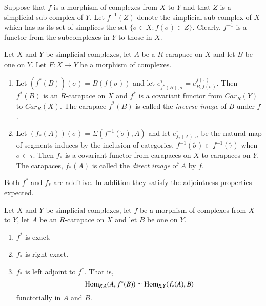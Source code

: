 Suppose that $f$ is a morphism of complexes from $X$ to $Y$ and that $Z$ is a simplicial sub-complex of $Y$. Let $f^{-1}(Z)$ denote the simplicial sub-complex of $X$ which has as its set of simplices the set $\{\sigma \in X : f(\sigma)\in Z \}$. Clearly, $f^{-1}$ is a functor from the subcomplexes in $Y$ to those in $X$.

\begin{definition}\label{art6-definition-5.1}
Let $X$ and $Y$ be simplicial complexes, let $A$ be a  $R$-carapace on $X$ and let $B$ be one on $Y$. Let $F:X \rightarrow Y$ be a morphism of complexes.

    \begin{enumerate}[(1)]
    \item Let $(f^{*}(B))(\sigma)=B(f(\sigma))$ and let $ e_{f^{*}(B), \sigma}^{\tau} = e_{B, f(\sigma)}^{f(\tau)}$. Then $f^{*}(B)$ is an $R$-carapace on $X$ and $f^{*}$ is a covariant functor from $C ar_{R}(Y)$ to $C ar_{R}(X)$. The carapace $f^{*}(B)$ is called the \textit{inverse image} of $B$ under $f$. \label{art6-definition5.1-enum-(1)}
    
    \item Let $(f_{*}(A))(\sigma) = \Sigma(f^{-1}(\tilde{\sigma}), A)$ and let $e_{f_{*}(A), \sigma}^{\tau}$ be the natural map of segments induces by the inclusion of categories, $f^{-1}(\tilde{\sigma})\subset f^{-1}(\tilde\tau)$ when $\sigma \subset \tau$. Then $f_{*}$ is a covariant functor from carapaces on $X$ to carapaces on $Y$. The carapaces, $f_{*}(A)$ is called the \textit{direct image} of $A$ by $f$.\label{art6-definition5.1-enum-(2)}
    \end{enumerate}
    
    Both $f^{*}$ and $f_{*}$ are additive. In addition they satisfy the adjointness properties expected.
\end{definition}

\begin{theorem}\label{art6-thm-5.2}
Let $X$ and $Y$ be simplicial complexes, let $f$ be a morphism of complexes from $X$ to $Y$, let $A$ be an $R$-carapace on $X$ and let $B$ be one on $Y$.
    \begin{enumerate}[(1)]
    \item $f^{*}$ is exact.\label{art6-thm5.2-enum-1}
    \item $f_{*}$ is right exact.\label{art6-thm5.2-enum-2}
    \item $f_{*}$ is left adjoint to $f^{*}$. That is,
    $$
    \operatorname{Hom}_{R, A}(A, f^{*}(B))\simeq \operatorname{Hom}_{R,Y}(f_{*}(A), B)
    $$
    functorially in $A$ and $B$.\label{art6-thm5.2-enum-3}
    \end{enumerate}
\end{theorem}

